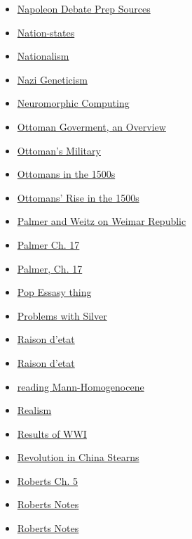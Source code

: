 \documentclass[11pt]{article}
\begin{document}
\begin{itemize}
\begin{itemize}
\begin{itemize}
\item \href{history/history10/KBhHIST201NapoleonDebatePrep.org}{Napoleon Debate Prep Sources}
\item \href{history/history10/KBhHIST201NationStates.org}{Nation-states}
\item \href{history/history10/KBhHIST201Nationalism.org}{Nationalism}
\item \href{history/history10/Kbe21hist201floNaziGeneticism.org}{Nazi Geneticism}
\item \href{history/history10/KBxNeuromorphicComputing.org}{Neuromorphic Computing}
\item \href{history/history10/KBhHIST201OttomanGovmntOverview.org}{Ottoman Goverment, an Overview}
\item \href{history/history10/KBOttomansMilitary.org}{Ottoman's Military}
\item \href{history/history10/KBhHIST201Ottomans1500.org}{Ottomans in the 1500s}
\item \href{history/history10/KBhHIST201OttomansRise.org}{Ottomans' Rise in the 1500s}
\item \href{history/history10/KBxWeimarRepublic.org}{Palmer and Weitz on Weimar Republic}
\item \href{history/history10/KBxPalmerCH17.org}{Palmer Ch. 17}
\item \href{history/history10/KBhHIST201PalmerCh17.org}{Palmer, Ch. 17}
\item \href{history/history10/KBxPopExibhit.org}{Pop Essasy thing}
\item \href{history/history10/KBhHIST201ProblemsWithSilver.org}{Problems with Silver}
\item \href{history/history10/KBhHIST201RaisonDeEtat.org}{Raison d'etat}
\item \href{history/history10/KBrefRaisondetat.org}{Raison d'etat}
\item \href{history/history10/KB20200826092400.org}{reading Mann-Homogenocene}
\item \href{history/history10/KBhHIST201Realism.org}{Realism}
\item \href{history/history10/KBhHIST201WWIResults.org}{Results of WWI}
\item \href{history/history10/KBe21hist201floRevolutionInChina.org}{Revolution in China Stearns}
\item \href{history/history10/KBhHIST201RobertsCh5.org}{Roberts Ch. 5}
\item \href{history/history10/KBRobertsNotes.org}{Roberts Notes}
\item \href{history/history10/KBOnRoberts.org}{Roberts Notes}

\end{itemize}
\end{itemize}
\end{itemize}
\end{document}
